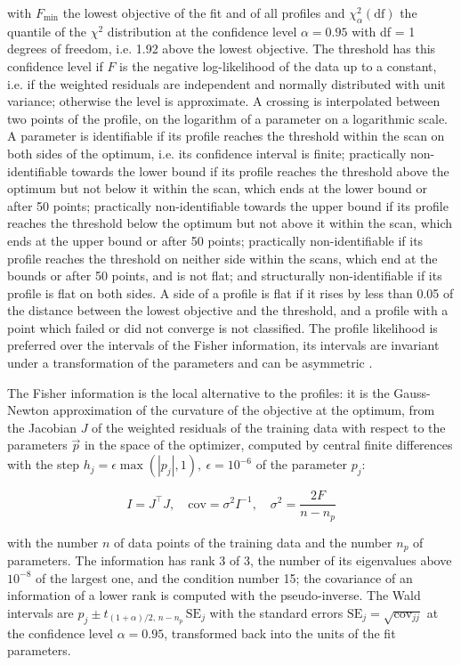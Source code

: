 \documentclass{article}
\begin{document}
with $F_{\min}$ the lowest objective of the fit and of all profiles and $\chi^2_{\alpha}(\mathrm{df})$ the quantile of the $\chi^2$ distribution at the confidence level $\alpha = 0.95$ with df = 1 degrees of freedom, i.e. 1.92 above the lowest objective. The threshold has this confidence level if $F$ is the negative log-likelihood of the data up to a constant, i.e. if the weighted residuals are independent and normally distributed with unit variance; otherwise the level is approximate. A crossing is interpolated between two points of the profile, on the logarithm of a parameter on a logarithmic scale. A parameter is identifiable if its profile reaches the threshold within the scan on both sides of the optimum, i.e. its confidence interval is finite; practically non-identifiable towards the lower bound if its profile reaches the threshold above the optimum but not below it within the scan, which ends at the lower bound or after 50 points; practically non-identifiable towards the upper bound if its profile reaches the threshold below the optimum but not above it within the scan, which ends at the upper bound or after 50 points; practically non-identifiable if its profile reaches the threshold on neither side within the scans, which end at the bounds or after 50 points, and is not flat; and structurally non-identifiable if its profile is flat on both sides. A side of a profile is flat if it rises by less than 0.05 of the distance between the lowest objective and the threshold, and a profile with a point which failed or did not converge is not classified. The profile likelihood is preferred over the intervals of the Fisher information, its intervals are invariant under a transformation of the parameters and can be asymmetric \cite{Wieland2021}.

The Fisher information is the local alternative to the profiles: it is the Gauss-Newton approximation of the curvature of the objective at the optimum, from the Jacobian $J$ of the weighted residuals of the training data with respect to the parameters $\vec{p}$ in the space of the optimizer, computed by central finite differences with the step $h_j = \epsilon \max(|p_j|, 1),\ \epsilon = 10^{-6}$ of the parameter $p_j$:

\begin{equation}
I = J^\top J, \quad \mathrm{cov} = \sigma^2 I^{-1}, \quad \sigma^2 = \frac{2 F}{n - n_p}
\end{equation}

with the number $n$ of data points of the training data and the number $n_p$ of parameters. The information has rank 3 of 3, the number of its eigenvalues above $10^{-8}$ of the largest one, and the condition number 15; the covariance of an information of a lower rank is computed with the pseudo-inverse. The Wald intervals are $\hat{p}_j \pm t_{(1+\alpha)/2,\, n-n_p}\, \mathrm{SE}_j$ with the standard errors $\mathrm{SE}_j = \sqrt{\mathrm{cov}_{jj}}$ at the confidence level $\alpha = 0.95$, transformed back into the units of the fit parameters.
\end{document}
